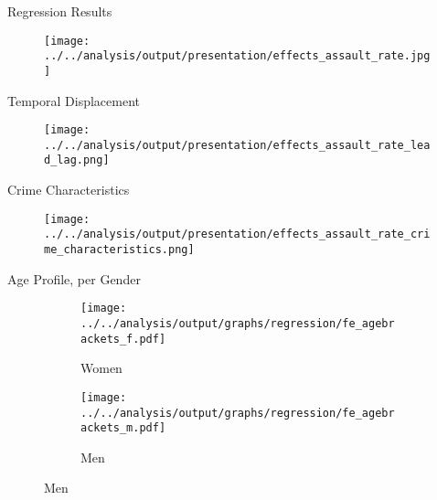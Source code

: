 \documentclass[usenames,dvipsnames]{beamer} %
\begin{document}

	\begin{frame}{Regression Results}\label{link_regression_baseline}
		\begin{figure}
			\texttt{[image: ../../analysis/output/presentation/effects\_assault\_rate.jpg]}
		\end{figure}
		\hyperlink{link_regression_victim_characteristic}{}
	\end{frame}

	\begin{frame}{Temporal Displacement}\label{link_regression_lead_lags}
		\begin{figure}
			\texttt{[image: ../../analysis/output/presentation/effects\_assault\_rate\_lead\_lag.png]}
		\end{figure}
		\hyperlink{link_regression_victim_characteristic}{}
	\end{frame}

	\begin{frame}{Crime Characteristics}\label{link_regression_crime_characteristics}
		\begin{figure}
			\texttt{[image: ../../analysis/output/presentation/effects\_assault\_rate\_crime\_characteristics.png]}
		\end{figure}
		\hyperlink{link_regression_victim_characteristic}{}
	\end{frame}

\begin{frame}{Age Profile, per Gender}\label{link_regression_age_profile_per_gender}
\begin{figure}
	\begin{subfigure}[h]{0.48\linewidth}\centering\caption{Women}
		\texttt{[image: ../../analysis/output/graphs/regression/fe\_agebrackets\_f.pdf]}
	\end{subfigure}
	\begin{subfigure}[h]{0.48\linewidth}\centering\caption{Men}
		\texttt{[image: ../../analysis/output/graphs/regression/fe\_agebrackets\_m.pdf]}
	\end{subfigure}
\end{figure}
\hyperlink{link_regression_age_profile}{}
\end{frame}
\end{document}
